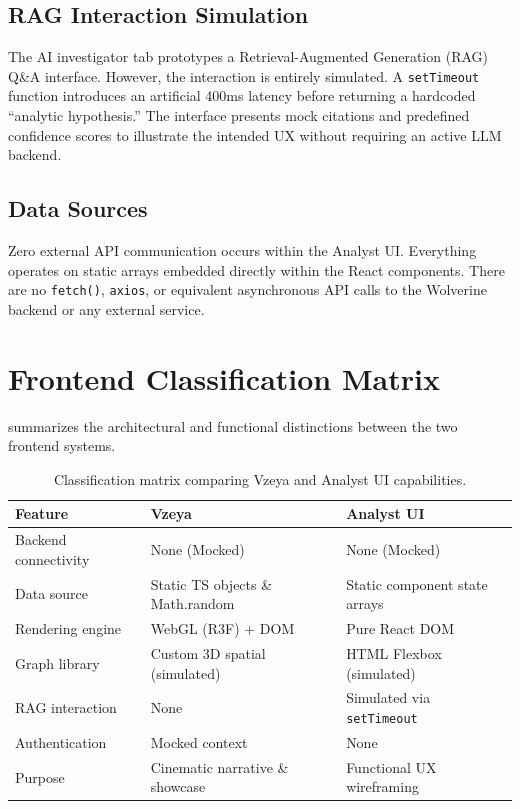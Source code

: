 \subsection{RAG Interaction Simulation}
\label{sec:fe-analyst-rag}

The AI investigator tab prototypes a Retrieval-Augmented Generation (RAG) Q\&A interface. However, the interaction is entirely simulated. A \texttt{setTimeout} function introduces an artificial 400ms latency before returning a hardcoded ``analytic hypothesis.'' The interface presents mock citations and predefined confidence scores to illustrate the intended UX without requiring an active LLM backend.

\subsection{Data Sources}
\label{sec:fe-analyst-data}

Zero external API communication occurs within the Analyst UI. Everything operates on static arrays embedded directly within the React components. There are no \texttt{fetch()}, \texttt{axios}, or equivalent asynchronous API calls to the Wolverine backend or any external service.

\section{Frontend Classification Matrix}
\label{sec:fe-matrix}

 summarizes the architectural and functional distinctions between the two frontend systems.

\begin{table}[htbp]
    \centering
    \caption{Classification matrix comparing Vzeya and Analyst UI capabilities.}
    \label{tab:fe-classification}
    \begin{tabular}{@{}lll@{}}
        \toprule
        \textbf{Feature} & \textbf{Vzeya} & \textbf{Analyst UI} \\
        \midrule
        Backend connectivity & None (Mocked) & None (Mocked) \\
        Data source & Static TS objects \& Math.random & Static component state arrays \\
        Rendering engine & WebGL (R3F) + DOM & Pure React DOM \\
        Graph library & Custom 3D spatial (simulated) & HTML Flexbox (simulated) \\
        RAG interaction & None & Simulated via \texttt{setTimeout} \\
        Authentication & Mocked context & None \\
        Purpose & Cinematic narrative \& showcase & Functional UX wireframing \\
        \bottomrule
    \end{tabular}
\end{table}

